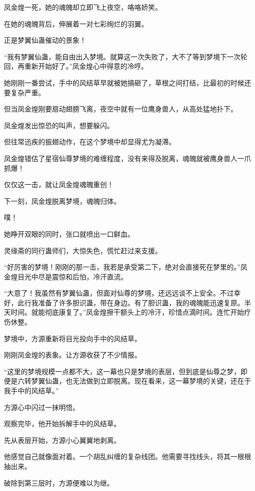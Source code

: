 
\begin{this_body}

凤金煌一死，她的魂魄却立即飞上夜空，咯咯娇笑。

在她的魂魄背后，伸展着一对七彩绚烂的羽翼。

正是梦翼仙蛊催动的景象！

“我有梦翼仙蛊，能自由出入梦境。就算这一次失败了，大不了等到梦境下一次轮回，再重新开始好了。”凤金煌心中得意的冷哼。

她刚刚一番尝试，手中的风结草早就被她搞砸了，草根之间打结，比最初的时候还要复杂严重。

但当凤金煌刚要扇动翅膀飞离，夜空中就有一位鹰身兽人，从高处猛地扑下。

凤金煌发出惊恐的叫声，想要躲闪。

但往常迅疾的振翅动作，在这个梦境中却显得尤为凝滞。

凤金煌错估了星宿仙尊梦境的难缠程度，没有来得及脱离，魂魄就被鹰身兽人一爪抓爆！

仅仅这一击，就让凤金煌魂魄重创！

下一刻，凤金煌脱离梦境，魂魄归体。

噗！

她睁开双眼的同时，张口就喷出一口鲜血。

灵缘斋的同行蛊师们，大惊失色，慌忙赶过来支援。

“好厉害的梦境！刚刚的那一击，我若是承受第二下，绝对会直接死在梦里的。”凤金煌目光中尽是震惊和后怕，冷汗直流。

“大意了！我虽然有梦翼仙蛊，但面对仙尊的梦境，还远远谈不上安全。不过幸好，此行我准备了许多胆识蛊，带在身边。有了胆识蛊，我的魂魄能迅速复原。半天时间。就能彻底康复了。”凤金煌擦干额头上的冷汗，珍惜点滴时间。连忙开始疗伤休整。

梦境中，方源重新将目光投向手中的风结草。

刚刚凤金煌的表象。让方源收获了不少情报。

“这里的梦境规模一点都不大，这一幕也只是梦境的表层，但到底是仙尊之梦，即便是六转梦翼仙蛊，也无法做到立即脱离。现在看来，这一幕梦境的关键，还在于我手中的风结草。”

方源心中闪过一抹明悟。

观察完毕，他开始拆解手中的风结草。

先从表层开始，方源小心翼翼地剥离。

他感觉自己就像面对着。一个胡乱纠缠的复杂线团。他需要寻找线头，将其一根根抽出来。

破除到第三层时，方源便难以为继。


\end{this_body}

